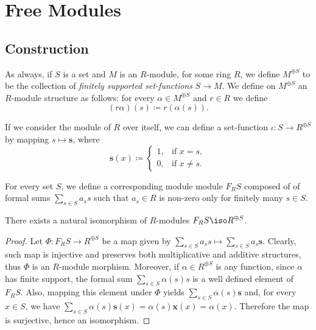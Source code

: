 \section{Free Modules}

\subsection{Construction}

As always, if \(S\) is a set and \(M\) is an \(R\)-module, for some ring \(R\),
we define \(M^{\oplus S}\) to be the collection of \emph{finitely supported
  set-functions} \(S \to M\). We define on \(M^{\oplus S}\) an \(R\)-module
structure as follows: for every \(\alpha \in M^{\oplus S}\) and \(r \in R\) we
define
\[
(r \alpha)(s) \coloneq r (\alpha(s)).
\]

If we consider the module of \(R\) over itself, we can define a set-function
\(\iota: S \to R^{\oplus S}\) by mapping \(s \mapsto \mathbf{s}\), where
\[
\mathbf{s}(x) \coloneq
\begin{cases}
  1, &\text{if } x = s, \\
  0, &\text{if } x \neq s.
\end{cases}
\]

For every set \(S\), we define a corresponding module module \(F_R S\) composed
of of formal sums \(\sum_{s \in S} a_s s\) such that \(a_s \in R\) is non-zero
only for finitely many \(s \in S\).

\begin{proposition}
\label{prop:free-module-structure-isomorphism}
There exists a natural isomorphism of \(R\)-modules \(F_R S \iso R^{\oplus S}\).
\end{proposition}

\begin{proof}
Let \(\Phi: F_R S \to R^{\oplus S}\) be a map given by
\(\sum_{s \in S} a_s s \mapsto \sum_{s \in S} a_s \mathbf{s}\). Clearly, such
map is injective and preserves both multiplicative and additive structures, thus
\(\Phi\) is an \(R\)-module morphism. Moreover, if \(\alpha \in R^{\oplus S}\)
is any function, since \(\alpha\) has finite support, the formal sum
\(\sum_{s \in S} \alpha(s) s\) is a well defined element of \(F_R S\). Also,
mapping this element under \(\Phi\) yields
\(\sum_{s \in S} \alpha(s) \mathbf{s}\) and, for every \(x \in S\), we have
\(\sum_{s \in S} \alpha(s) \mathbf{s}(x) = \alpha(s) \mathbf{x}(x) =
\alpha(x)\). Therefore the map is surjective, hence an isomorphism.
\end{proof}

